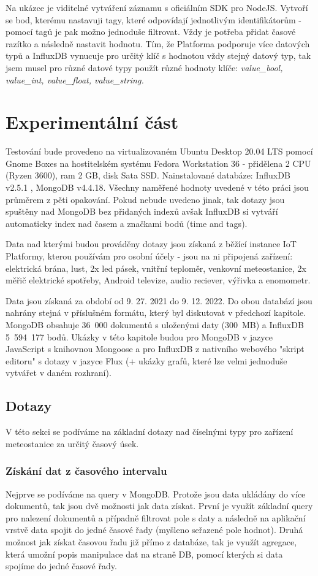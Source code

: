 \documentclass{article}
\begin{document}
Na ukázce je viditelné vytváření záznamu s oficiálním SDK pro NodeJS. Vytvoří se bod, kterému nastavuji tagy, které odpovídají jednotlivým identifikátorům - pomocí tagů je pak možno jednoduše filtrovat. Vždy je potřeba přidat časové razítko a následně nastavit hodnotu. Tím, že Platforma podporuje více datových typů a InfluxDB vynucuje pro určitý klíč s hodnotou vždy stejný datový typ, tak jsem musel pro různé datové typy použít různé hodnoty klíče: \it{value\_bool}, \it{value\_int}, \it{value\_float}, \it{value\_string}.

\section{Experimentální část}
Testování bude provedeno na virtualizovaném Ubuntu Desktop 20.04 LTS pomocí Gnome Boxes na hostitelském systému Fedora Workstation 36 - přidělena 2 CPU (Ryzen 3600), ram 2 GB, disk Sata SSD. Nainstalované databáze: InfluxDB v2.5.1 , MongoDB v4.4.18. Všechny naměřené hodnoty uvedené v této práci jsou průměrem z pěti opakování. Pokud nebude uvedeno jinak, tak dotazy jsou spuštěny nad MongoDB bez přidaných indexů avšak InfluxDB si vytváří automaticky index nad časem a značkami bodů (time and tags).

Data nad kterými budou prováděny dotazy jsou získaná z běžící instance IoT Platformy, kterou používám pro osobní účely - jsou na ni připojená zařízení: elektrická brána, lust, 2x led pásek, vnitřní teploměr, venkovní meteostanice, 2x měřič elektrické spotřeby, Android televize, audio reciever, výřivka a enomometr. 

Data jsou získaná za období od 9. 27. 2021 do 9. 12. 2022. Do obou databází jsou nahrány stejná v příslušném formátu, který byl diskutovat v předchozí kapitole. MongoDB obsahuje 36~000 dokumentů s uloženými daty (300~MB) a InfluxDB 5~594~177 bodů. Ukázky v této kapitole budou pro MongoDB v jazyce JavaScript s knihovnou Mongoose a pro InfluxDB z nativního webového "skript editoru" s dotazy v jazyce Flux (+ ukázky grafů, které lze velmi jednoduše vytvářet v daném rozhraní).

\subsection{Dotazy}
V této sekci se podíváme na základní dotazy nad číselnými typy pro zařízení meteostanice za určitý časový úsek.

\subsubsection{Získání dat z časového intervalu}
Nejprve se podíváme na query v MongoDB. Protože jsou data ukládány do více dokumentů, tak jsou dvě možnosti jak data získat. První je využít základní query pro nalezení dokumentů a případně filtrovat pole s daty a následně na aplikační vrstvě data spojit do jedné časové řady (myšleno seřazené pole hodnot). Druhá možnost jak získat časovou řadu již přímo z databáze, tak je využít agregace, která umožní popis manipulace dat na straně DB, pomocí kterých si data spojíme do jedné časové řady.
\end{document}
